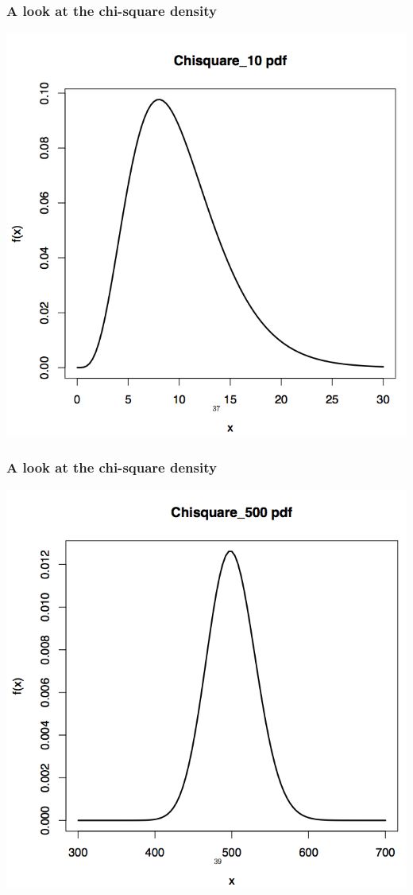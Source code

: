 \documentclass[handout]{beamer}\usepackage[]{graphicx}\usepackage[]{color}
\numberwithin{equation}{section}
\begin{document}
\begin{frame}
\frametitle{A look at the chi-square density}
 \includegraphics{../../fig/chipict3.png}
\end{frame}
\begin{frame}
\frametitle{A look at the chi-square density}
 \includegraphics{../../fig/chipict4.png}
\end{frame}
\end{document}

